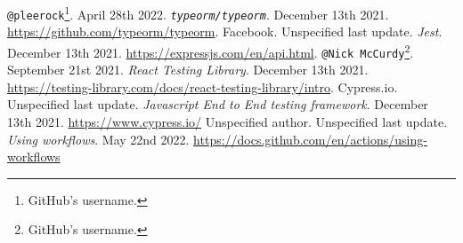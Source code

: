\documentclass[a4paper, 12pt, oneside]{book}
\begin{document}
\begin{thebibliography}{9}
	\texttt{@pleerock}\footnote{GitHub's username.}. April 28th 2022. \emph{\texttt{typeorm/typeorm}}. December 13th 2021. \url{https://github.com/typeorm/typeorm}.
	Facebook. Unspecified last update. \emph{Jest}. December 13th 2021. \url{https://expressjs.com/en/api.html}.
	\texttt{@Nick McCurdy}\footnote{GitHub's username.}. September 21st 2021. \emph{React Testing Library}. December 13th 2021. \url{https://testing-library.com/docs/react-testing-library/intro}.
	Cypress.io. Unspecified last update. \emph{Javascript End to End testing framework}. December 13th 2021. \url{https://www.cypress.io/}
	Unspecified author. Unspecified last update. \emph{Using workflows}. May 22nd 2022. \url{https://docs.github.com/en/actions/using-workflows}
\end{thebibliography}
\end{document}
